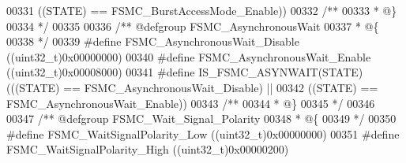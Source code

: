 \begin{DoxyCode}
00331                                   \textcolor{preprocessor}{(}\textcolor{preprocessor}{(}\textcolor{preprocessor}{STATE}\textcolor{preprocessor}{)} \textcolor{preprocessor}{==} FSMC_BurstAccessMode_Enable\textcolor{preprocessor}{)}\textcolor{preprocessor}{)}
00332 \textcolor{comment}{/**}
00333 \textcolor{comment}{  * @\}}
00334 \textcolor{comment}{  */}
00335 
00336 \textcolor{comment}{/** @defgroup FSMC\_AsynchronousWait }
00337 \textcolor{comment}{  * @\{}
00338 \textcolor{comment}{  */}
00339 \textcolor{preprocessor}{#}\textcolor{preprocessor}{define} \textcolor{preprocessor}{FSMC\_AsynchronousWait\_Disable}            \textcolor{preprocessor}{(}\textcolor{preprocessor}{(}\textcolor{preprocessor}{uint32\_t}\textcolor{preprocessor}{)}0x00000000\textcolor{preprocessor}{)}
00340 \textcolor{preprocessor}{#}\textcolor{preprocessor}{define} \textcolor{preprocessor}{FSMC\_AsynchronousWait\_Enable}             \textcolor{preprocessor}{(}\textcolor{preprocessor}{(}\textcolor{preprocessor}{uint32\_t}\textcolor{preprocessor}{)}0x00008000\textcolor{preprocessor}{)}
00341 \textcolor{preprocessor}{#}\textcolor{preprocessor}{define} \textcolor{preprocessor}{IS\_FSMC\_ASYNWAIT}\textcolor{preprocessor}{(}\textcolor{preprocessor}{STATE}\textcolor{preprocessor}{)} \textcolor{preprocessor}{(}\textcolor{preprocessor}{(}\textcolor{preprocessor}{(}\textcolor{preprocessor}{STATE}\textcolor{preprocessor}{)} \textcolor{preprocessor}{==} FSMC_AsynchronousWait_Disable\textcolor{preprocessor}{)} \textcolor{preprocessor}{||}
00342                                  \textcolor{preprocessor}{(}\textcolor{preprocessor}{(}\textcolor{preprocessor}{STATE}\textcolor{preprocessor}{)} \textcolor{preprocessor}{==} FSMC_AsynchronousWait_Enable\textcolor{preprocessor}{)}\textcolor{preprocessor}{)}
00343 \textcolor{comment}{/**}
00344 \textcolor{comment}{  * @\}}
00345 \textcolor{comment}{  */}
00346 
00347 \textcolor{comment}{/** @defgroup FSMC\_Wait\_Signal\_Polarity }
00348 \textcolor{comment}{  * @\{}
00349 \textcolor{comment}{  */}
00350 \textcolor{preprocessor}{#}\textcolor{preprocessor}{define} \textcolor{preprocessor}{FSMC\_WaitSignalPolarity\_Low}              \textcolor{preprocessor}{(}\textcolor{preprocessor}{(}\textcolor{preprocessor}{uint32\_t}\textcolor{preprocessor}{)}0x00000000\textcolor{preprocessor}{)}
00351 \textcolor{preprocessor}{#}\textcolor{preprocessor}{define} \textcolor{preprocessor}{FSMC\_WaitSignalPolarity\_High}             \textcolor{preprocessor}{(}\textcolor{preprocessor}{(}\textcolor{preprocessor}{uint32\_t}\textcolor{preprocessor}{)}0x00000200\textcolor{preprocessor}{)}

\end{DoxyCode}
